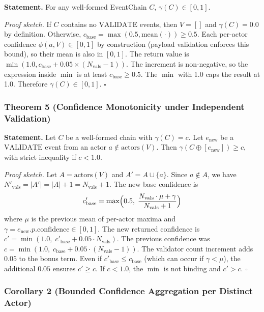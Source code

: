 \textbf{Statement.} For any well-formed EventChain $C$, $\gamma(C) \in [0, 1]$.

\emph{Proof sketch.} If $C$ contains no $\text{VALIDATE}$ events, then $V = []$ and $\gamma(C) = 0.0$ by definition. Otherwise, $c_{\text{base}} = \max(0.5, \text{mean}(\cdot)) \geq 0.5$. Each per-actor confidence $\phi(a, V) \in [0, 1]$ by construction (payload validation enforces this bound), so their mean is also in $[0, 1]$. The return value is $\min(1.0, c_{\text{base}} + 0.05 \times (N_{\text{vals}} - 1))$. The increment is non-negative, so the expression inside $\min$ is at least $c_{\text{base}} \geq 0.5$. The $\min$ with 1.0 caps the result at 1.0. Therefore $\gamma(C) \in [0, 1]$. $\square$

\subsubsection{Theorem 5 (Confidence Monotonicity under Independent Validation)}\label{c.6.6-theorem-5-confidence-monotonicity-under-independent-validation}

\textbf{Statement.} Let $C$ be a well-formed chain with $\gamma(C) = c$. Let $e_{\text{new}}$ be a $\text{VALIDATE}$ event from an actor $a \notin \text{actors}(V)$. Then $\gamma(C \oplus [e_{\text{new}}]) \geq c$, with strict inequality if $c < 1.0$.

\emph{Proof sketch.} Let $A = \text{actors}(V)$ and $A' = A \cup \{a\}$. Since $a \notin A$, we have $N'_{\text{vals}} = |A'| = |A| + 1 = N_{\text{vals}} + 1$. The new base confidence is
\[
c'_{\text{base}} = \max\Bigl(0.5,\; \frac{N_{\text{vals}} \cdot \mu + \gamma}{N_{\text{vals}} + 1}\Bigr)
\]
where $\mu$ is the previous mean of per-actor maxima and $\gamma = e_{\text{new}}.p.\text{confidence} \in [0, 1]$. The new returned confidence is $c' = \min(1.0,\; c'_{\text{base}} + 0.05 \cdot N_{\text{vals}})$. The previous confidence was $c = \min(1.0,\; c_{\text{base}} + 0.05 \cdot (N_{\text{vals}} - 1))$. The validator count increment adds $0.05$ to the bonus term. Even if $c'_{\text{base}} \leq c_{\text{base}}$ (which can occur if $\gamma < \mu$), the additional $0.05$ ensures $c' \geq c$. If $c < 1.0$, the $\min$ is not binding and $c' > c$. $\square$

\subsubsection{Corollary 2 (Bounded Confidence Aggregation per Distinct Actor)}\label{c.6.7-corollary-2-bounded-confidence-aggregation-per-distinct-actor}

